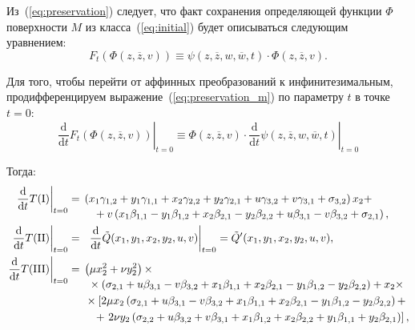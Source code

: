 \documentclass[../main.tex]{subfiles}
\begin{document}
Из~(\ref{eq:preservation}) следует, что факт сохранения определяющей функции $\Phi$ поверхности $M$ из класса~(\ref{eq:initial}) будет описываться следующим уравнением:
\begin{equation}\label{eq:preservation_m}
F_t\left(\Phi(z, \overline{z}, v)\right) \equiv \psi(z, \overline{z}, w, \overline{w}, t) \cdot \Phi(z, \overline{z}, v).
\end{equation}

Для того, чтобы перейти от аффинных преобразований к инфинитезимальным, продифференцируем выражение~(\ref{eq:preservation_m}) по параметру $t$ в точке $t = 0$:
\begin{equation}\label{eq:diff}
\left.\frac{\mathrm d}{\mathrm{d}t} F_t\left(\Phi(z, \overline{z}, v)\right)\right|_{t = 0} \equiv \Phi(z, \overline{z}, v) \cdot \left.\frac{\mathrm d}{\mathrm{d}t}\psi(z, \overline{z}, w, \overline{w}, t)\right|_{t=0}
\end{equation}

Тогда:
\begin{align*}
\left.\frac{\mathrm d}{\mathrm{d}t}T(\mathrm{\RN{1}})\right|_{t = 0} &=
\begin{multlined}[t]
\left(x_1 \gamma_{1,2}+y_1 \gamma_{1,1}+x_2 \gamma_{2,2}+y_2 \gamma_{2,1} + u \gamma_{3,2}+v \gamma_{3,1}+\sigma_{3,2}\right) x_2 + \\
 + v \left(x_1 \beta_{1,1}-y_1 \beta_{1,2}+x_2 \beta_{2,1}-y_2 \beta_{2,2} + u \beta_{3,1}-v \beta_{3,2}+\sigma_{2,1}\right),
\end{multlined}\nonumber\\
\left.\frac{\mathrm d}{\mathrm{d}t}T(\mathrm{\RN{2}})\right|_{t = 0} &=
\begin{multlined}[t]
\ \left.\frac{\mathrm d}{\mathrm{d}t}\tilde{Q}(x_1,y_1,x_2,y_2,u,v)\right|_{t=0} = \tilde{Q}^{\prime}(x_1,y_1,x_2,y_2,u,v),
\end{multlined}\\
\left.\frac{\mathrm d}{\mathrm{d}t}T(\mathrm{\RN{3}})\right|_{t = 0} &=
\begin{multlined}[t]
\left(\mu  x_2^2+\nu  y_2^2\right) \times \\
\times\left(\sigma _{2,1}+u \beta _{3,1}-v \beta _{3,2}+x_1 \beta _{1,1}+x_2 \beta _{2,1}-y_1 \beta _{1,2}-y_2 \beta_{2,2}\right)+x_2 \times \\
\times\left[2 \mu  x_2 \left(\sigma _{2,1}+u \beta _{3,1}-v \beta _{3,2}+x_1 \beta _{1,1}+x_2 \beta _{2,1}-y_1 \beta _{1,2}-y_2 \beta_{2,2}\right)+\right. \\
+ \left.2 \nu  y_2 \left(\sigma _{2,2}+u \beta _{3,2}+v \beta _{3,1}+x_1 \beta _{1,2}+x_2 \beta _{2,2}+y_1 \beta _{1,1}+y_2 \beta_{2,1}\right)\right],\nonumber
\end{multlined}
\end{align*}
\end{document}
